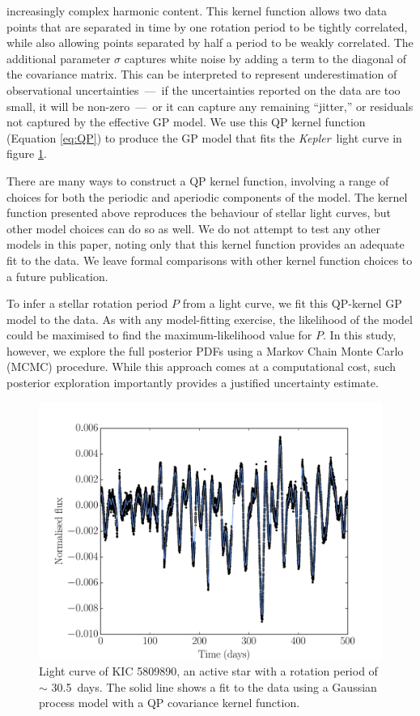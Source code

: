 \documentclass[a4paper,fleqn,usenatbib,useAMS]{mnras}
\newcommand{\Kepler}{{\it Kepler}}
\newcommand{\kepexample}{5809890}
\newcommand{\kepexampleperiod}{30.5}
\begin{document}
increasingly complex harmonic content.
This kernel function allows two data points that are separated in time by one
rotation period to be tightly correlated, while also allowing
points separated by half a period to be weakly correlated.
The additional parameter $\sigma$ captures white noise by adding
a term to the diagonal of the covariance matrix.
This can be interpreted to represent underestimation of observational
uncertainties~---~if the uncertainties reported on the data are too small, it
will be non-zero~---~or it can capture any remaining ``jitter,'' or residuals
not captured by the effective GP model.
We use this QP kernel function (Equation \ref{eq:QP}) to produce
the GP model that fits the \Kepler\ light curve in figure
\ref{fig:GP_example}.

There are many ways to construct a QP kernel function, involving a range of
choices for both the periodic and aperiodic components of the model.
The kernel function presented above reproduces the behaviour of stellar light
curves, but other model choices can do so as well.
We do not attempt to test any other models in this paper, noting only that
this kernel function provides an adequate fit to the data.
We leave formal comparisons with other kernel function choices to a future
publication.

To infer a stellar rotation period $P$ from a light curve, we fit this
QP-kernel GP model to the data.  As with any model-fitting exercise, the
likelihood
of the model could be maximised to find the maximum-likelihood value for $P$.
In this study, however, we explore the full posterior PDFs using a Markov
Chain Monte Carlo (MCMC) procedure.  While
this approach comes at a computational cost, such posterior exploration
importantly provides a justified uncertainty estimate.

\begin{figure}
\begin{center}
\includegraphics[width=\columnwidth, clip=true]{figures/koi_lc_demo.pdf}
\caption[A light curve with a GP model.]
{Light curve of KIC \kepexample, an active star with a rotation period of
$\sim$ \kepexampleperiod\ days.
The solid line shows a fit to the data using a Gaussian process model with a QP
covariance kernel function.}
\label{fig:GP_example}
\end{center}
\end{figure}
\end{document}
